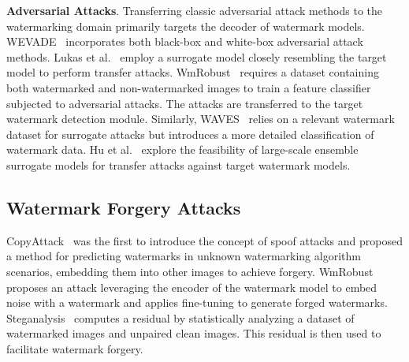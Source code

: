\textbf{Adversarial Attacks}. Transferring classic adversarial attack methods to the watermarking domain primarily targets the decoder of watermark models. WEVADE~\cite{jiang2023evading} incorporates both black-box and white-box adversarial attack methods. Lukas et al.~\cite{lukas2024leveraging} employ a surrogate model closely resembling the target model to perform transfer attacks. WmRobust~\cite{saberi2023robustness} requires a dataset containing both watermarked and non-watermarked images to train a feature classifier subjected to adversarial attacks. The attacks are transferred to the target watermark detection module. Similarly, WAVES~\cite{an2024benchmarking} relies on a relevant watermark dataset for surrogate attacks but introduces a more detailed classification of watermark data. Hu et al.~\cite{hu2024transfer} explore the feasibility of large-scale ensemble surrogate models for transfer attacks against target watermark models.

\subsection{Watermark Forgery Attacks}
CopyAttack~\cite{kutter2000watermark} was the first to introduce the concept of spoof attacks and proposed a method for predicting watermarks in unknown watermarking algorithm scenarios, embedding them into other images to achieve forgery. WmRobust~\cite{saberi2023robustness} proposes an attack leveraging the encoder of the watermark model to embed noise with a watermark and applies fine-tuning to generate forged watermarks. Steganalysis~\cite{yang2024steganalysis} computes a residual by statistically analyzing a dataset of watermarked images and unpaired clean images. This residual is then used to facilitate watermark forgery.